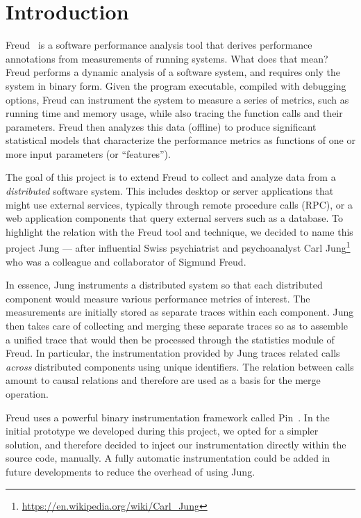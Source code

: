 \chapter{Introduction}

Freud~\cite{freud} is a software performance analysis tool that
derives performance annotations from measurements of running
systems. What does that mean?  Freud performs a dynamic analysis of a
software system, and requires only the system in binary form.  Given
the program executable, compiled with debugging options, Freud can
instrument the system to measure a series of metrics, such as running
time and memory usage, while also tracing the function calls and their
parameters. Freud then analyzes this data (offline) to produce
significant statistical models that characterize the performance
metrics as functions of one or more input parameters (or
``features'').

The goal of this project is to extend Freud to collect and analyze
data from a \emph{distributed} software system.  This includes desktop
or server applications that might use external services, typically
through remote procedure calls (RPC), or a web application components
that query external servers such as a database.  To highlight the
relation with the Freud tool and technique, we decided to name this
project Jung --- after influential Swiss psychiatrist and psychoanalyst
Carl Jung\footnote{\url{https://en.wikipedia.org/wiki/Carl_Jung}} who
was a colleague and collaborator of Sigmund Freud.

In essence, Jung instruments a distributed system so that each
distributed component would measure various performance metrics of
interest.  The measurements are initially stored as separate traces
within each component.  Jung then takes care of collecting and merging
these separate traces so as to assemble a unified trace that would
then be processed through the statistics module of Freud.  In
particular, the instrumentation provided by Jung traces related calls
\emph{across} distributed components using unique identifiers.  The 
relation between calls amount to causal relations and therefore are
used as a basis for the merge operation.

Freud uses a powerful binary instrumentation framework called
Pin~\cite{PIN}.  In the initial prototype we developed during this
project, we opted for a simpler solution, and therefore decided to
inject our instrumentation directly within the source code, manually.
A fully automatic instrumentation could be added in future
developments to reduce the overhead of using Jung.


